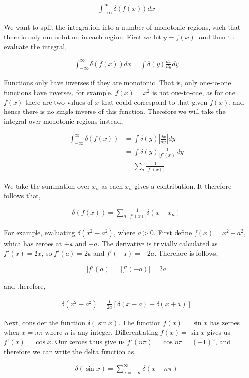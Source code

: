 \documentclass[11pt]{amsart}
\begin{document}
\begin{align*}
  \int_{-\infty}^{\infty} \delta\left(f(x)\right) dx
\end{align*}

We want to split the integration into a number of monotonic regions, such that there is only one solution in each region. First we let $y = f(x)$, and then to evaluate the integral,

\begin{align*}
  \int_{-\infty}^{\infty} \delta\left(f(x)\right) dx = \int \delta(y) \frac{dx}{dy} dy
\end{align*}

Functions only have inverses if they are monotonic. That is, only one-to-one functions have inverses, for example, $f(x) = x^2$ is not one-to-one, as for one $f(x)$ there are two values of $x$ that could correspond to that given $f(x)$, and hence there is no single inverse of this function. Therefore we will take the integral over monotonic regions instead,

\begin{align*}
  \int_{-\infty}^{\infty} \delta\left(f(x)\right) &= \int \delta(y) \left|\frac{dx}{dy}\right| dy \\
                                                  &= \int \delta(y) \frac{1}{|f'(x)|} dy \\
                                                  &= \sum\limits_n \frac{1}{|f'(x)|}
\end{align*}

We take the summation over $x_n$ as each $x_n$ gives a contribution. It therefore follows that,

\begin{align*}
  \delta\left(f(x)\right) = \sum\limits_n \frac{1}{|f'(x)|} \delta(x - x_n)
\end{align*}

For example, evaluating $\delta(x^2 - a^2)$, where $a > 0$. First define $f(x) = x^2 - a^2$, which has zeroes at $+a$ and $-a$. The derivative is trivially calculated as $f'(x) = 2x$, so $f'(a) = 2a$ and $f'(-a) = -2a$. Therefore is follows,

\begin{align*}
  |f'(a)| = |f'(-a)| = 2a
\end{align*}

and therefore,

\begin{align*}
  \delta(x^2 - a^2) = \frac{1}{2a}\left[\delta(x - a) + \delta(x + a)\right]
\end{align*}

Next, consider the function $\delta(\sin{x})$. The function $f(x) = \sin{x}$ has zeroes when $x = n\pi$ where $n$ is any integer. Differentiating $f(x)= \sin{x}$ gives us $f'(x) = \cos{x}$. Our zeroes thus give us $f'(n\pi) = \cos n\pi = {(-1)}^n$, and therefore we can write the delta function as,

\begin{align*}
  \delta(\sin{x}) = \sum\limits_{n=-\infty}^{\infty} \delta(x - n\pi)
\end{align*}
\end{document}
